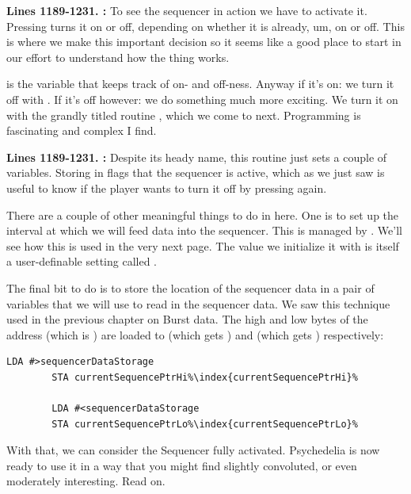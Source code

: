 \textbf{Lines 1189-1231. :} To see the sequencer in action we have to activate it. Pressing  turns it on or off, depending on whether
it is already, um, on or off. This is where we make this important decision so it seems like a good place to start in our effort to understand how the thing works.

  is the variable that keeps track of on- and off-ness. Anyway if it's on: we turn it off
with . If it's off however: we do something much more exciting. We turn it on with the grandly titled routine
, which we come to next. Programming is fascinating and complex I find.

\textbf{Lines 1189-1231. :}  Despite its heady name, this routine just sets a couple of variables.
Storing  in  flags that the sequencer is active, which as we just saw is useful to know if the player wants
to turn it off by pressing  again. 

There are a couple of other meaningful things to do in here. One is to set up the interval at which we will feed data into the sequencer.
This is managed by . We'll see how this is used in the very next page. The value we initialize it
with is itself a user-definable setting called .

The final bit to do is to store the location of the sequencer data in a pair of variables that we will use to read in the sequencer data. We
saw this technique used in the previous chapter on Burst data. The high and low bytes of the address  (which is ) are loaded to 
 (which gets ) and  (which gets ) respectively:
\begin{lstlisting}[escapechar=\%]
        LDA #>sequencerDataStorage
        STA currentSequencePtrHi%\index{currentSequencePtrHi}%

        LDA #<sequencerDataStorage
        STA currentSequencePtrLo%\index{currentSequencePtrLo}%
\end{lstlisting}

With that, we can consider the Sequencer fully activated. Psychedelia is now ready to use it in a way that you might find slightly 
convoluted, or even moderately interesting. Read on.

